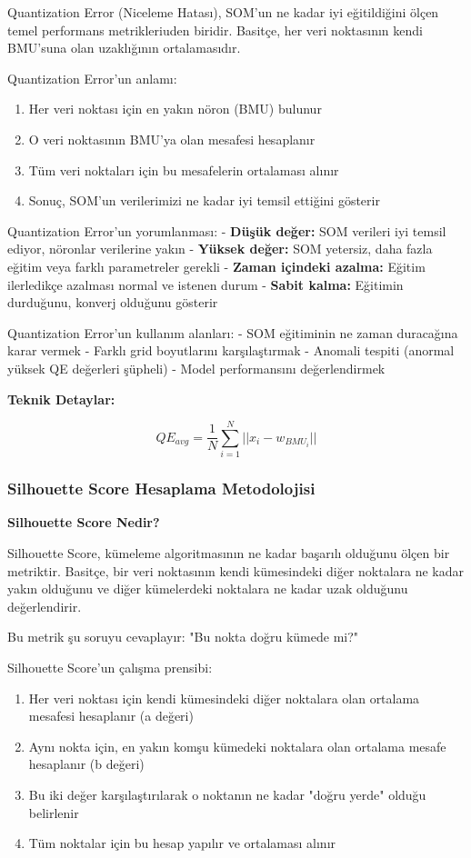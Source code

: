 Quantization Error (Niceleme Hatası), SOM'un ne kadar iyi eğitildiğini ölçen temel performans metrikleriuden biridir. Basitçe, her veri noktasının kendi BMU'suna olan uzaklığının ortalamasıdır.

Quantization Error'un anlamı:
\begin{enumerate}
    \item Her veri noktası için en yakın nöron (BMU) bulunur
    \item O veri noktasının BMU'ya olan mesafesi hesaplanır
    \item Tüm veri noktaları için bu mesafelerin ortalaması alınır
    \item Sonuç, SOM'un verilerimizi ne kadar iyi temsil ettiğini gösterir
\end{enumerate}

Quantization Error'un yorumlanması:
- \textbf{Düşük değer:} SOM verileri iyi temsil ediyor, nöronlar verilerine yakın
- \textbf{Yüksek değer:} SOM yetersiz, daha fazla eğitim veya farklı parametreler gerekli
- \textbf{Zaman içindeki azalma:} Eğitim ilerledikçe azalması normal ve istenen durum
- \textbf{Sabit kalma:} Eğitimin durduğunu, konverj olduğunu gösterir

Quantization Error'un kullanım alanları:
- SOM eğitiminin ne zaman duracağına karar vermek
- Farklı grid boyutlarını karşılaştırmak
- Anomali tespiti (anormal yüksek QE değerleri şüpheli)
- Model performansını değerlendirmek

\textbf{Teknik Detaylar:}

\begin{equation}
QE_{avg} = \frac{1}{N} \sum_{i=1}^{N} ||x_i - w_{BMU_i}||
\label{eq:quantization_error}
\end{equation}

\newpage

\subsubsection{Silhouette Score Hesaplama Metodolojisi}

\textbf{Silhouette Score Nedir?}

Silhouette Score, kümeleme algoritmasının ne kadar başarılı olduğunu ölçen bir metriktir. Basitçe, bir veri noktasının kendi kümesindeki diğer noktalara ne kadar yakın olduğunu ve diğer kümelerdeki noktalara ne kadar uzak olduğunu değerlendirir.

Bu metrik şu soruyu cevaplayır: "Bu nokta doğru kümede mi?" 

Silhouette Score'un çalışma prensibi:
\begin{enumerate}
    \item Her veri noktası için kendi kümesindeki diğer noktalara olan ortalama mesafesi hesaplanır (a değeri)
    \item Aynı nokta için, en yakın komşu kümedeki noktalara olan ortalama mesafe hesaplanır (b değeri)
    \item Bu iki değer karşılaştırılarak o noktanın ne kadar "doğru yerde" olduğu belirlenir
    \item Tüm noktalar için bu hesap yapılır ve ortalaması alınır
\end{enumerate}

